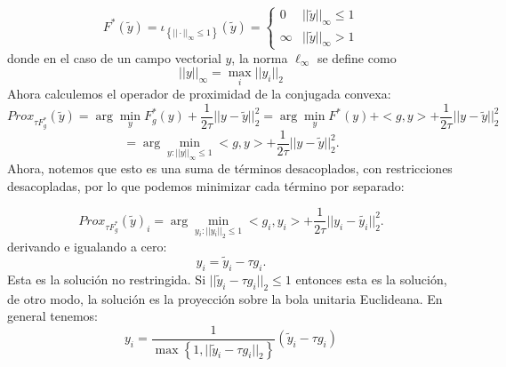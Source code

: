 \documentclass[12pt,draftcls, onecolumn, letterpaper,compsoc]{IEEEtran}
\begin{document}
\begin{equation}
    F^{*}(\tilde{y}) = \iota_{\left\lbrace ||\cdot||_{\infty}\leq 1 \right\rbrace}(\tilde{y}) = \left\lbrace \begin{array}{ll}
        0   &   ||\tilde{y}||_{\infty} \leq 1\\
        \infty   &   ||\tilde{y}||_{\infty} > 1
        \end{array}\right.
\end{equation}
donde en el caso de un campo vectorial $y$, la norma $\ell_{\infty}$ se define como
\begin{equation}
    ||y||_{\infty} = \max_{i} ||y_i||_2
\end{equation}
Ahora calculemos el operador de proximidad de la conjugada convexa:
\begin{displaymath}
    Prox_{\tau F^{*}_{g}}(\tilde{y}) = \arg\min_{y} F^{*}_{g}(y) + \frac{1}{2\tau}||y-\tilde{y}||_{2}^{2} =
    \arg\min_{y} F^{*}(y) + <g, y> + \frac{1}{2\tau}||y-\tilde{y}||_{2}^{2}
\end{displaymath}
\begin{displaymath}
    =\arg\min_{y: ||y||_{\infty}\leq 1} <g,y> + \frac{1}{2\tau}||y-\tilde{y}||_{2}^{2}.
\end{displaymath}
Ahora, notemos que esto es una suma de t\'{e}rminos desacoplados, con restricciones desacopladas, por lo que podemos minimizar cada t\'{e}rmino por separado:

\begin{displaymath}
    Prox_{\tau F^{*}_{g}}(\tilde{y})_{i}=\arg\min_{y_{i}: ||y_{i}||_{2}\leq 1} <g_i,y_i> + \frac{1}{2\tau}||y_i-\tilde{y_i}||_{2}^{2}.
\end{displaymath}
derivando e igualando a cero:
\begin{displaymath}
    y_{i} = \tilde{y}_i - \tau g_i.
\end{displaymath}
Esta es la soluci\'{o}n no restringida. Si $||\tilde{y}_i - \tau g_i||_2 \leq 1$ entonces esta es la soluci\'{o}n, de otro modo, la soluci\'{o}n es la proyecci\'{o}n sobre la bola unitaria Euclideana. En general tenemos:
\begin{displaymath}
    y_{i} = \frac{1}{\max\left\lbrace 1, ||\tilde{y}_i - \tau g_i||_2\right\rbrace}(\tilde{y}_i - \tau g_i)
\end{displaymath}
\end{document}
